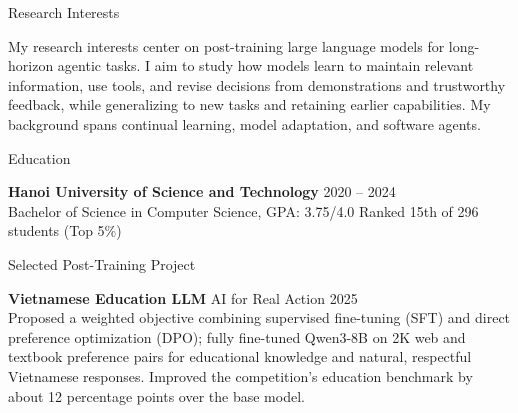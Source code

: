\documentclass{resume}
\begin{document}
\begin{rSection}{Research Interests}

My research interests center on post-training large language models for long-horizon
agentic tasks. I aim to study how models learn to maintain relevant information, use
tools, and revise decisions from demonstrations and trustworthy feedback, while
generalizing to new tasks and retaining earlier capabilities. My background spans
continual learning, model adaptation, and software agents.

\end{rSection}

\begin{rSection}{Education}

\textbf{Hanoi University of Science and Technology} \hfill 2020 -- 2024\\
Bachelor of Science in Computer Science, GPA: 3.75/4.0
\hfill Ranked 15th of 296 students (Top 5\%)

\end{rSection}

\begin{rSection}{Selected Post-Training Project}

\textbf{Vietnamese Education LLM} \hfill AI for Real Action 2025\\
Proposed a weighted objective combining supervised fine-tuning (SFT) and direct
preference optimization (DPO); fully fine-tuned Qwen3-8B on 2K web and textbook
preference pairs for educational knowledge and natural, respectful Vietnamese
responses. Improved the competition's education benchmark by about 12 percentage
points over the base model.\par{}

\end{rSection}
\end{document}
